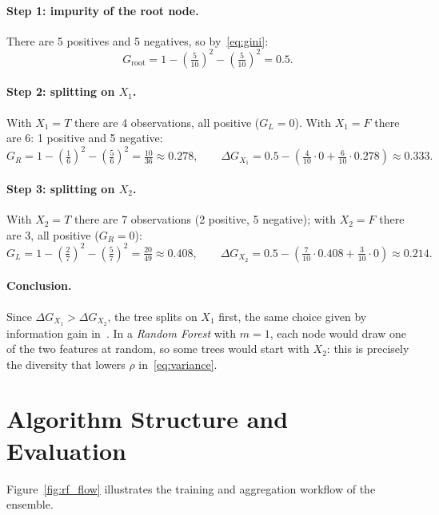 \documentclass[12pt, a4paper]{article}
\begin{document}
\paragraph{Step 1: impurity of the root node.} There are 5 positives and 5 negatives, so by~\eqref{eq:gini}:
\[
G_{\text{root}} = 1 - \left(\tfrac{5}{10}\right)^2 - \left(\tfrac{5}{10}\right)^2 = 0.5 .
\]

\paragraph{Step 2: splitting on $X_1$.} With $X_1 = T$ there are 4 observations, all positive ($G_L = 0$). With $X_1 = F$ there are 6: 1 positive and 5 negative:
\[
G_R = 1 - \left(\tfrac{1}{6}\right)^2 - \left(\tfrac{5}{6}\right)^2 = \tfrac{10}{36} \approx 0.278,
\qquad
\Delta G_{X_1} = 0.5 - \left( \tfrac{4}{10}\cdot 0 + \tfrac{6}{10}\cdot 0.278 \right) \approx 0.333 .
\]

\paragraph{Step 3: splitting on $X_2$.} With $X_2 = T$ there are 7 observations (2 positive, 5 negative); with $X_2 = F$ there are 3, all positive ($G_R = 0$):
\[
G_L = 1 - \left(\tfrac{2}{7}\right)^2 - \left(\tfrac{5}{7}\right)^2 = \tfrac{20}{49} \approx 0.408,
\qquad
\Delta G_{X_2} = 0.5 - \left( \tfrac{7}{10}\cdot 0.408 + \tfrac{3}{10}\cdot 0 \right) \approx 0.214 .
\]

\paragraph{Conclusion.} Since $\Delta G_{X_1} > \Delta G_{X_2}$, the tree splits on $X_1$ first, the same choice given by information gain in~\cite{cs307}. In a \textit{Random Forest} with $m = 1$, each node would draw one of the two features at random, so some trees would start with $X_2$: this is precisely the diversity that lowers $\rho$ in~\eqref{eq:variance}.

\section{Algorithm Structure and Evaluation}

Figure~\ref{fig:rf_flow} illustrates the training and aggregation workflow of the ensemble.
\end{document}
